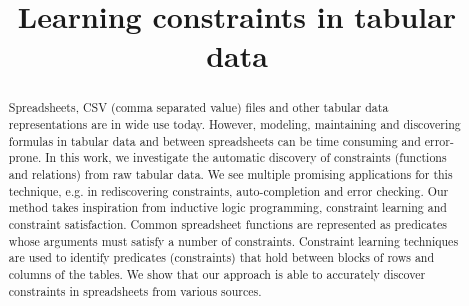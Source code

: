 \documentclass{IEEEtran}
\theoremstyle{definition}
\begin{document}
\title{Learning constraints in tabular data}


\maketitle

\begin{abstract}
Spreadsheets, CSV (comma separated value) files and other tabular data representations are in wide use today.
However, modeling, maintaining and discovering formulas in tabular data and between spreadsheets can be time consuming and error-prone.
In this work, we investigate the automatic discovery of constraints (functions and relations) from raw tabular data.
We see multiple promising applications for this technique, e.g. in rediscovering constraints, auto-completion and error checking.
Our method takes inspiration from inductive logic programming, constraint learning and constraint satisfaction.
Common spreadsheet functions are represented as predicates whose arguments must satisfy a number of constraints.
Constraint learning techniques are used to identify predicates (constraints) that hold between blocks of rows and columns of the tables.
We show that our approach is able to accurately discover constraints in spreadsheets from various sources.
\end{abstract}
\end{document}
